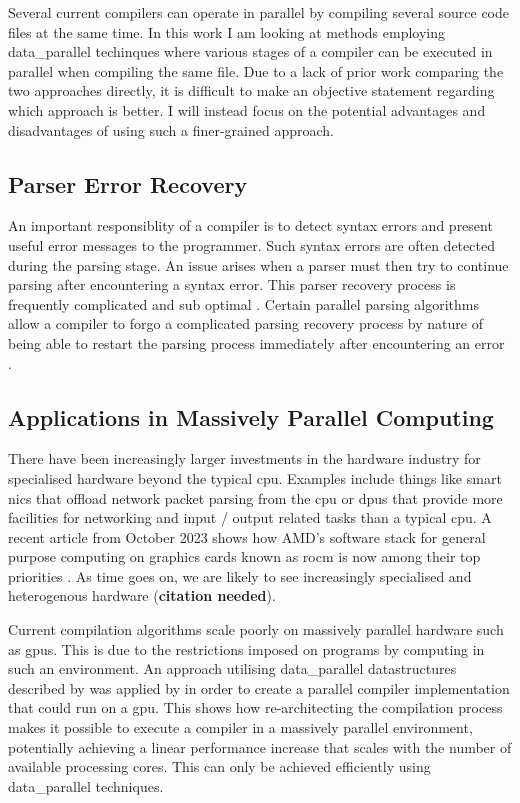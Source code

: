 Several current compilers can operate in parallel by compiling several source
code files at the same time. In this work I am looking at methods employing
\gls{data_parallel} techinques where various stages of a compiler can be executed in
parallel when compiling the same file. Due to a lack of prior work comparing
the two approaches directly, it is difficult to make an objective statement
regarding which approach is better. I will instead focus on the potential
advantages and disadvantages of using such a finer-grained approach.

\subsection{Parser Error Recovery}

An important responsiblity of a compiler is to detect syntax errors and
present useful error messages to the programmer. Such syntax errors are often
detected during the parsing stage. An issue arises when a parser must then try
to continue parsing after encountering a syntax error. This parser recovery
process is frequently complicated and sub optimal \citep{medeiros_syntax_2018,
hutchison_pika_2020}. Certain parallel parsing algorithms allow a compiler
to forgo a complicated parsing recovery process by nature of being able
to restart the parsing process immediately after encountering an error
\citep{clarke_error_1993}.

\subsection{Applications in Massively Parallel Computing}

There have been increasingly larger investments in the hardware industry for
specialised hardware beyond the typical \gls{cpu}. Examples include things like smart
\gls{nic}s that offload network packet parsing from the \gls{cpu} or \gls{dpu}s that provide
more facilities for networking and input / output related tasks than a typical
\gls{cpu}. A recent article from October 2023 shows how AMD’s software stack for
general purpose computing on graphics cards known as \gls{rocm} is now among their
top priorities \citep{ward-foxton_rocm_2023}. As time goes on, we are likely
to see increasingly specialised and heterogenous hardware (\textbf{citation
needed}).

Current compilation algorithms scale poorly on massively parallel hardware
such as \gls{gpu}s. This is due to the restrictions imposed on programs by
computing in such an environment. An approach utilising \gls{data_parallel}
datastructures described by \cite{hillis_data_1986} was applied by
\cite{voetter_compilation_2022} in order to create a parallel compiler
implementation that could run on a \gls{gpu}. This shows how  re-architecting
the compilation process makes it possible to execute a compiler in a massively
parallel environment, potentially achieving a linear performance increase that
scales with the number of available processing cores. This can only be achieved
efficiently using \gls{data_parallel} techniques.

